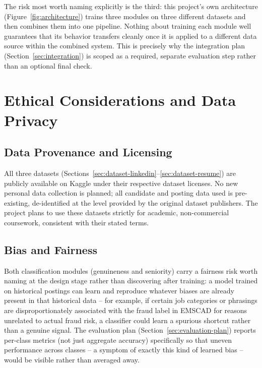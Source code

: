 \documentclass[11pt,a4paper]{article}
\begin{document}
The risk most worth naming explicitly is the third: this project's own architecture
(Figure~\ref{fig:architecture}) trains three modules on three different datasets and
then combines them into one pipeline. Nothing about training each module well
guarantees that its behavior transfers cleanly once it is applied to a different data
source within the combined system. This is precisely why the integration plan
(Section~\ref{sec:integration}) is scoped as a required, separate evaluation step rather
than an optional final check.

\section{Ethical Considerations and Data Privacy}
\label{sec:ethics}

\subsection{Data Provenance and Licensing}

All three datasets (Sections~\ref{sec:dataset-linkedin}--\ref{sec:dataset-resume}) are
publicly available on Kaggle under their respective dataset licenses. No new personal
data collection is planned; all candidate and posting data used is pre-existing,
de-identified at the level provided by the original dataset publishers. The project
plans to use these datasets strictly for academic, non-commercial coursework, consistent
with their stated terms.

\subsection{Bias and Fairness}

Both classification modules (genuineness and seniority) carry a fairness risk worth
naming at the design stage rather than discovering after training: a model trained on
historical postings can learn and reproduce whatever biases are already present in that
historical data -- for example, if certain job categories or phrasings are
disproportionately associated with the fraud label in EMSCAD for reasons unrelated to
actual fraud risk, a classifier could learn a spurious shortcut rather than a genuine
signal. The evaluation plan (Section~\ref{sec:evaluation-plan}) reports per-class metrics
(not just aggregate accuracy) specifically so that uneven performance across classes --
a symptom of exactly this kind of learned bias -- would be visible rather than averaged
away.
\end{document}
